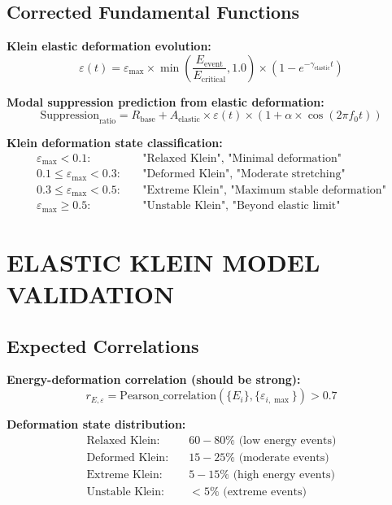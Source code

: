 \documentclass[12pt,a4paper]{article}
\begin{document}
\subsection{Corrected Fundamental Functions}

\textbf{Klein elastic deformation evolution:}
\begin{equation}
\varepsilon(t) = \varepsilon_{\max} \times \min\left(\frac{E_{\text{event}}}{E_{\text{critical}}}, 1.0\right) \times (1 - e^{-\gamma_{\text{elastic}} t})
\end{equation}

\textbf{Modal suppression prediction from elastic deformation:}
\begin{equation}
\text{Suppression}_{\text{ratio}} = R_{\text{base}} + A_{\text{elastic}} \times \varepsilon(t) \times (1 + \alpha \times \cos(2\pi f_0 t))
\end{equation}

\textbf{Klein deformation state classification:}
\begin{align}
\varepsilon_{\max} < 0.1: &\quad \text{"Relaxed Klein", "Minimal deformation"}\\
0.1 \leq \varepsilon_{\max} < 0.3: &\quad \text{"Deformed Klein", "Moderate stretching"}\\
0.3 \leq \varepsilon_{\max} < 0.5: &\quad \text{"Extreme Klein", "Maximum stable deformation"}\\
\varepsilon_{\max} \geq 0.5: &\quad \text{"Unstable Klein", "Beyond elastic limit"}
\end{align}

\section{ELASTIC KLEIN MODEL VALIDATION}

\subsection{Expected Correlations}

\textbf{Energy-deformation correlation (should be strong):}
\begin{equation}
r_{E,\varepsilon} = \text{Pearson\_correlation}(\{E_i\}, \{\varepsilon_{i,\max}\}) > 0.7
\end{equation}

\textbf{Deformation state distribution:}
\begin{align}
\text{Relaxed Klein:} &\quad 60-80\% \text{ (low energy events)}\\
\text{Deformed Klein:} &\quad 15-25\% \text{ (moderate events)}\\
\text{Extreme Klein:} &\quad 5-15\% \text{ (high energy events)}\\
\text{Unstable Klein:} &\quad <5\% \text{ (extreme events)}
\end{align}
\end{document}
